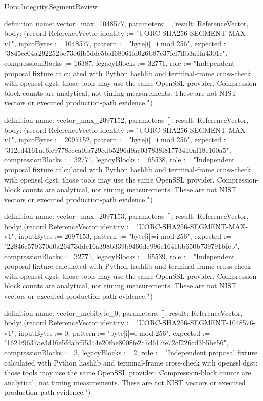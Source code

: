 \begin{lexlean}{Uorc.Integrity.SegmentReview}
\begin{semanticmodule}
definition{
  name: vector_max_1048577,
  parameters: [],
  result: ReferenceVector,
  body: (record ReferenceVector {identity := "UORC-SHA256-SEGMENT-MAX-v1", inputBytes := 1048577, pattern := "byte[i]=i mod 256", expected := "3845ec04a292252be73e6fb5dde5baf68061fd026b87e37fef7ffb3a1fa4301c", compressionBlocks := 16387, legacyBlocks := 32771, role := "Independent proposal fixture calculated with Python hashlib and terminal-frame cross-check with openssl dgst; those tools may use the same OpenSSL provider. Compression-block counts are analytical, not timing measurements. These are not NIST vectors or executed production-path evidence."})
}

definition{
  name: vector_max_2097152,
  parameters: [],
  result: ReferenceVector,
  body: (record ReferenceVector {identity := "UORC-SHA256-SEGMENT-MAX-v1", inputBytes := 2097152, pattern := "byte[i]=i mod 256", expected := "312ed4161ae6fc9778ccea0fa729cdb5296d9ac037838f81773410af18e160a5", compressionBlocks := 32771, legacyBlocks := 65538, role := "Independent proposal fixture calculated with Python hashlib and terminal-frame cross-check with openssl dgst; those tools may use the same OpenSSL provider. Compression-block counts are analytical, not timing measurements. These are not NIST vectors or executed production-path evidence."})
}

definition{
  name: vector_max_2097153,
  parameters: [],
  result: ReferenceVector,
  body: (record ReferenceVector {identity := "UORC-SHA256-SEGMENT-MAX-v1", inputBytes := 2097153, pattern := "byte[i]=i mod 256", expected := "22846c579370d0a26473ddc16a398b339b9460dc996e1641bb650b739791bfcb", compressionBlocks := 32771, legacyBlocks := 65539, role := "Independent proposal fixture calculated with Python hashlib and terminal-frame cross-check with openssl dgst; those tools may use the same OpenSSL provider. Compression-block counts are analytical, not timing measurements. These are not NIST vectors or executed production-path evidence."})
}

definition{
  name: vector_mebibyte_0,
  parameters: [],
  result: ReferenceVector,
  body: (record ReferenceVector {identity := "UORC-SHA256-SEGMENT-1048576-v1", inputBytes := 0, pattern := "byte[i]=i mod 256", expected := "1621f9637ae3d16e5fdabf55344e20fbe8008fe2c7d617fe72cf226cd3b5be56", compressionBlocks := 3, legacyBlocks := 2, role := "Independent proposal fixture calculated with Python hashlib and terminal-frame cross-check with openssl dgst; those tools may use the same OpenSSL provider. Compression-block counts are analytical, not timing measurements. These are not NIST vectors or executed production-path evidence."})
}


\end{semanticmodule}
\end{lexlean}
